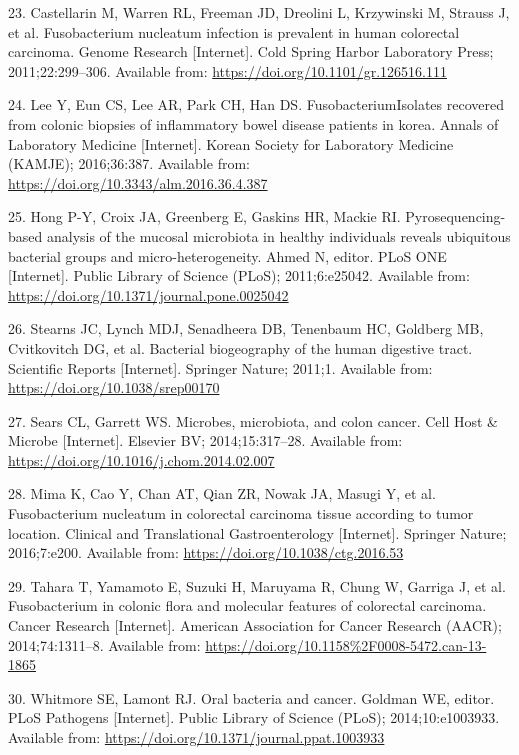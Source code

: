 \documentclass[12pt,]{article}
\begin{document}
\hypertarget{ref-Castellarin2011}{}
23. Castellarin M, Warren RL, Freeman JD, Dreolini L, Krzywinski M,
Strauss J, et al. Fusobacterium nucleatum infection is prevalent in
human colorectal carcinoma. Genome Research {[}Internet{]}. Cold Spring
Harbor Laboratory Press; 2011;22:299--306. Available from:
\url{https://doi.org/10.1101/gr.126516.111}

\hypertarget{ref-Lee2016}{}
24. Lee Y, Eun CS, Lee AR, Park CH, Han DS. FusobacteriumIsolates
recovered from colonic biopsies of inflammatory bowel disease patients
in korea. Annals of Laboratory Medicine {[}Internet{]}. Korean Society
for Laboratory Medicine (KAMJE); 2016;36:387. Available from:
\url{https://doi.org/10.3343/alm.2016.36.4.387}

\hypertarget{ref-Hong2011}{}
25. Hong P-Y, Croix JA, Greenberg E, Gaskins HR, Mackie RI.
Pyrosequencing-based analysis of the mucosal microbiota in healthy
individuals reveals ubiquitous bacterial groups and micro-heterogeneity.
Ahmed N, editor. PLoS ONE {[}Internet{]}. Public Library of Science
(PLoS); 2011;6:e25042. Available from:
\url{https://doi.org/10.1371/journal.pone.0025042}

\hypertarget{ref-Stearns2011}{}
26. Stearns JC, Lynch MDJ, Senadheera DB, Tenenbaum HC, Goldberg MB,
Cvitkovitch DG, et al. Bacterial biogeography of the human digestive
tract. Scientific Reports {[}Internet{]}. Springer Nature; 2011;1.
Available from: \url{https://doi.org/10.1038/srep00170}

\hypertarget{ref-Sears2014}{}
27. Sears CL, Garrett WS. Microbes, microbiota, and colon cancer. Cell
Host \& Microbe {[}Internet{]}. Elsevier BV; 2014;15:317--28. Available
from: \url{https://doi.org/10.1016/j.chom.2014.02.007}

\hypertarget{ref-Mima2016}{}
28. Mima K, Cao Y, Chan AT, Qian ZR, Nowak JA, Masugi Y, et al.
Fusobacterium nucleatum in colorectal carcinoma tissue according to
tumor location. Clinical and Translational Gastroenterology
{[}Internet{]}. Springer Nature; 2016;7:e200. Available from:
\url{https://doi.org/10.1038/ctg.2016.53}

\hypertarget{ref-Tahara_2014}{}
29. Tahara T, Yamamoto E, Suzuki H, Maruyama R, Chung W, Garriga J, et
al. Fusobacterium in colonic flora and molecular features of colorectal
carcinoma. Cancer Research {[}Internet{]}. American Association for
Cancer Research (AACR); 2014;74:1311--8. Available from:
\url{https://doi.org/10.1158\%2F0008-5472.can-13-1865}

\hypertarget{ref-Whitmore2014}{}
30. Whitmore SE, Lamont RJ. Oral bacteria and cancer. Goldman WE,
editor. PLoS Pathogens {[}Internet{]}. Public Library of Science (PLoS);
2014;10:e1003933. Available from:
\url{https://doi.org/10.1371/journal.ppat.1003933}
\end{document}
